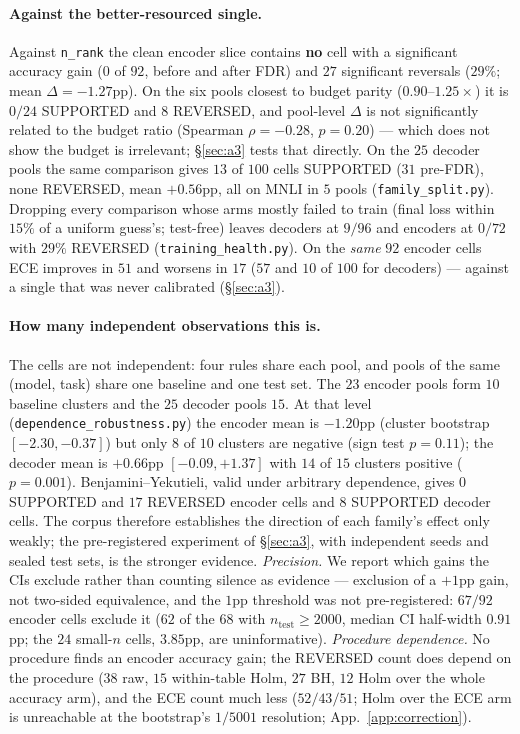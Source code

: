 \documentclass[11pt]{article}
\begin{document}
\paragraph{Against the better-resourced single.} Against \texttt{n\_rank} the clean encoder slice contains \textbf{no} cell with a significant accuracy gain ($0$ of $92$, before and after FDR) and $27$ significant reversals ($29\%$; mean $\Delta{=}{-}1.27$pp). On the six pools closest to budget parity ($0.90$--$1.25\times$) it is $0/24$ SUPPORTED and $8$ REVERSED, and pool-level $\Delta$ is not significantly related to the budget ratio (Spearman $\rho{=}{-}0.28$, $p{=}0.20$) --- which does not show the budget is irrelevant; \S\ref{sec:a3} tests that directly. On the $25$ decoder pools the same comparison gives $13$ of $100$ cells SUPPORTED ($31$ pre-FDR), none REVERSED, mean ${+}0.56$pp, all on MNLI in $5$ pools (\texttt{family\_\allowbreak split.\allowbreak py}). Dropping every comparison whose arms mostly failed to train (final loss within $15\%$ of a uniform guess's; test-free) leaves decoders at $9/96$ and encoders at $0/72$ with $29\%$ REVERSED (\texttt{training\_\allowbreak health.\allowbreak py}). On the \emph{same} $92$ encoder cells ECE improves in $51$ and worsens in $17$ ($57$ and $10$ of $100$ for decoders) --- against a single that was never calibrated (\S\ref{sec:a3}).

\paragraph{How many independent observations this is.} The cells are not independent: four rules share each pool, and pools of the same (model, task) share one baseline and one test set. The $23$ encoder pools form $10$ baseline clusters and the $25$ decoder pools $15$. At that level (\texttt{dependence\_\allowbreak robustness.\allowbreak py}) the encoder mean is ${-}1.20$pp (cluster bootstrap $[{-}2.30, {-}0.37]$) but only $8$ of $10$ clusters are negative (sign test $p{=}0.11$); the decoder mean is ${+}0.66$pp $[{-}0.09, {+}1.37]$ with $14$ of $15$ clusters positive ($p{=}0.001$). Benjamini--Yekutieli, valid under arbitrary dependence, gives $0$ SUPPORTED and $17$ REVERSED encoder cells and $8$ SUPPORTED decoder cells. The corpus therefore establishes the direction of each family's effect only weakly; the pre-registered experiment of \S\ref{sec:a3}, with independent seeds and sealed test sets, is the stronger evidence. \emph{Precision.} We report which gains the CIs exclude rather than counting silence as evidence --- exclusion of a $+1$pp gain, not two-sided equivalence, and the $1$pp threshold was not pre-registered: $67/92$ encoder cells exclude it ($62$ of the $68$ with $n_{\text{test}}{\geq}2000$, median CI half-width $0.91$pp; the $24$ small-$n$ cells, $3.85$pp, are uninformative). \emph{Procedure dependence.} No procedure finds an encoder accuracy gain; the REVERSED count does depend on the procedure ($38$ raw, $15$ within-table Holm, $27$ BH, $12$ Holm over the whole accuracy arm), and the ECE count much less ($52/43/51$; Holm over the ECE arm is unreachable at the bootstrap's $1/5001$ resolution; App.~\ref{app:correction}).
\end{document}
